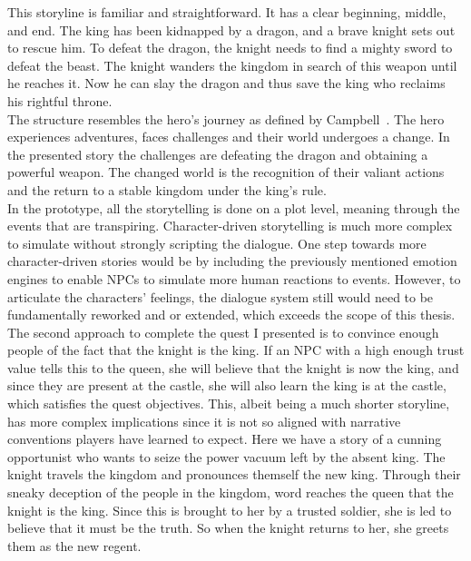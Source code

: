 This storyline is familiar and straightforward. It has a clear beginning, middle, and end. The king has been kidnapped by a dragon, and a brave knight sets out to rescue him. To defeat the dragon, the knight needs to find a mighty sword to defeat the beast. The knight wanders the kingdom in search of this weapon until he reaches it. Now he can slay the dragon and thus save the king who reclaims his rightful throne.\\
The structure resembles the hero's journey as defined by Campbell~\cite{Campbell2008}. The hero experiences adventures, faces challenges and their world undergoes a change. In the presented story the challenges are defeating the dragon and obtaining a powerful weapon. The changed world is the recognition of their valiant actions and the return to a stable kingdom under the king's rule.\\
In the prototype, all the storytelling is done on a plot level, meaning through the events that are transpiring. Character-driven storytelling is much more complex to simulate without strongly scripting the dialogue. One step towards more character-driven stories would be by including the previously mentioned emotion engines to enable NPCs to simulate more human reactions to events. However, to articulate the characters’ feelings, the dialogue system still would need to be fundamentally reworked and or extended, which exceeds the scope of this thesis.\\
The second approach to complete the quest I presented is to convince enough people of the fact that the knight is the king. If an NPC with a high enough trust value tells this to the queen, she will believe that the knight is now the king, and since they are present at the castle, she will also learn the king is at the castle, which satisfies the quest objectives. This, albeit being a much shorter storyline, has more complex implications since it is not so aligned with narrative conventions players have learned to expect. Here we have a story of a cunning opportunist who wants to seize the power vacuum left by the absent king. The knight travels the kingdom and pronounces themself the new king. Through their sneaky deception of the people in the kingdom, word reaches the queen that the knight is the king. Since this is brought to her by a trusted soldier, she is led to believe that it must be the truth. So when the knight returns to her, she greets them as the new regent.\\
